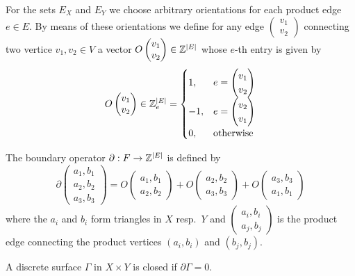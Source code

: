 \begin{definition}[Orientation]
For the sets $E_X$ and $E_Y$ we choose arbitrary orientations for each product edge $e \in E$.
 By means of these orientations we define for any edge $\begin{pmatrix}v_1 \\ v_2 \end{pmatrix}$ connecting two vertice $v_1,v_2 \in V$ a vector $O\begin{pmatrix}v_1 \\ v_2\end{pmatrix} \in \mathbb{Z}^{\lvert E\rvert}$ whose $e$-th entry is given by
\begin{equation}
O\begin{pmatrix}v_1 \\ v_2\end{pmatrix} \in \mathbb{Z}^{\lvert E\rvert}_e = \begin{cases}
1,& e = \begin{pmatrix}v_1\\v_2\end{pmatrix}\\
-1,& e = \begin{pmatrix}v_2\\v_1\end{pmatrix}\\
0,& \text{otherwise}
\end{cases}
\end{equation}
\end{definition}

\begin{definition}
The boundary operator $\partial : F \rightarrow \mathbb{Z}^{\lvert E\rvert}$ is defined by
\begin{equation}
\partial \begin{pmatrix} a_1, b_1 \\ a_2, b_2 \\ a_3, b_3 \end{pmatrix}
=
O\begin{pmatrix} a_1,b_1 \\ a_2,b_2 \end{pmatrix}
+
O\begin{pmatrix} a_2,b_2 \\ a_3,b_3 \end{pmatrix}
+
O\begin{pmatrix} a_3,b_3 \\ a_1,b_1 \end{pmatrix}
\end{equation}
where the $a_i$ and $b_i$ form triangles in $X$ resp.\ $Y$ and $\begin{pmatrix} a_i,b_i \\ a_j,b_j \end{pmatrix}$ is the product edge connecting the product vertices $(a_i,b_i)$ and $(b_j,b_j)$.

A discrete surface $\Gamma $ in $X \times Y$ is closed if $\partial \Gamma = 0$.
\end{definition}

